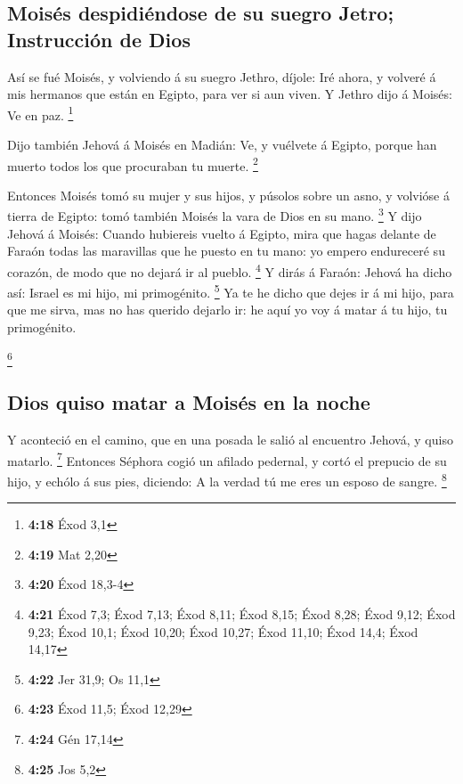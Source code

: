 \hypertarget{moisuxe9s-despidiuxe9ndose-de-su-suegro-jetro-instrucciuxf3n-de-dios}{%
\subsection{Moisés despidiéndose de su suegro Jetro; Instrucción de
Dios}\label{moisuxe9s-despidiuxe9ndose-de-su-suegro-jetro-instrucciuxf3n-de-dios}}

 Así se fué Moisés, y volviendo á su suegro Jethro, díjole:
Iré ahora, y volveré á mis hermanos que están en Egipto, para ver si aun
viven. Y Jethro dijo á Moisés: Ve en paz. \footnote{\textbf{4:18} Éxod
  3,1}

 Dijo también Jehová á Moisés en Madián: Ve, y vuélvete á
Egipto, porque han muerto todos los que procuraban tu muerte.
\footnote{\textbf{4:19} Mat 2,20}

 Entonces Moisés tomó su mujer y sus hijos, y púsolos sobre
un asno, y volvióse á tierra de Egipto: tomó también Moisés la vara de
Dios en su mano. \footnote{\textbf{4:20} Éxod 18,3-4}  Y
dijo Jehová á Moisés: Cuando hubiereis vuelto á Egipto, mira que hagas
delante de Faraón todas las maravillas que he puesto en tu mano: yo
empero endureceré su corazón, de modo que no dejará ir al pueblo.
\footnote{\textbf{4:21} Éxod 7,3; Éxod 7,13; Éxod 8,11; Éxod 8,15; Éxod
  8,28; Éxod 9,12; Éxod 9,23; Éxod 10,1; Éxod 10,20; Éxod 10,27; Éxod
  11,10; Éxod 14,4; Éxod 14,17}  Y dirás á Faraón: Jehová
ha dicho así: Israel es mi hijo, mi primogénito. \footnote{\textbf{4:22}
  Jer 31,9; Os 11,1}  Ya te he dicho que dejes ir á mi
hijo, para que me sirva, mas no has querido dejarlo ir: he aquí yo voy á
matar á tu hijo, tu primogénito.

\footnote{\textbf{4:23} Éxod 11,5; Éxod 12,29}

\hypertarget{dios-quiso-matar-a-moisuxe9s-en-la-noche}{%
\subsection{Dios quiso matar a Moisés en la
noche}\label{dios-quiso-matar-a-moisuxe9s-en-la-noche}}

 Y aconteció en el camino, que en una posada le salió al
encuentro Jehová, y quiso matarlo. \footnote{\textbf{4:24} Gén 17,14}
 Entonces Séphora cogió un afilado pedernal, y cortó el
prepucio de su hijo, y echólo á sus pies, diciendo: A la verdad tú me
eres un esposo de sangre. \footnote{\textbf{4:25} Jos 5,2}

